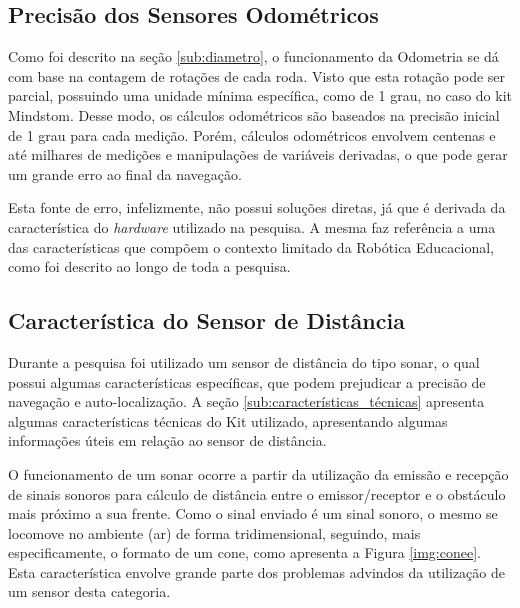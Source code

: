 \subsection{Precisão dos Sensores Odométricos}
\label{sub:precisao_sensores}

  Como foi descrito na seção \ref{sub:diametro}, o funcionamento da Odometria se dá com base na contagem de rotações de cada roda.
  Visto que esta rotação pode ser parcial, possuindo uma unidade mínima específica, como de 1 grau, no caso do kit Mindstom. Desse modo,
  os cálculos odométricos são baseados na precisão inicial de 1 grau para cada medição. Porém, cálculos odométricos envolvem centenas e até
  milhares de medições e manipulações de variáveis derivadas, o que pode gerar um grande erro ao final da navegação.

  Esta fonte de erro, infelizmente, não possui soluções diretas, já que é derivada da característica do \textit{hardware} utilizado
  na pesquisa. A mesma faz referência a uma das características que compõem o contexto limitado da Robótica Educacional,
  como foi descrito ao longo de toda a pesquisa.

\subsection{Característica do Sensor de Distância}
\label{sub:caracteristica_sensor}

  Durante a pesquisa foi utilizado um sensor de distância do tipo sonar, o qual possui algumas características específicas, que podem
  prejudicar a precisão de navegação e auto-localização. A seção \ref{sub:características_técnicas} apresenta algumas características
  técnicas do Kit utilizado, apresentando algumas informações úteis em relação ao sensor de distância.

  O funcionamento de um sonar ocorre a partir da utilização da emissão e recepção de sinais sonoros para cálculo de distância entre
  o emissor/receptor e o obstáculo mais próximo a sua frente. Como o sinal enviado é um sinal sonoro, o mesmo se locomove no ambiente (ar)
  de forma tridimensional, seguindo, mais especificamente, o formato de um cone, como apresenta a Figura \ref{img:conee}. Esta característica
  envolve grande parte dos problemas advindos da utilização de um sensor desta categoria.


